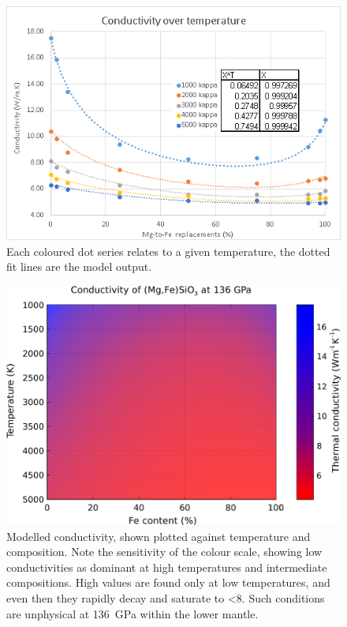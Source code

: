 \begin{figure}[h]
  \includegraphics[width=\linewidth]{Figures/draft_kC.png}
  \caption{Each coloured dot series relates to a given temperature, the dotted fit lines are the model output.}
  \label{fig:draft_kc}
\end{figure}

\begin{figure}[h]
  \includegraphics[width=\linewidth]{Figures/K_over_T_over_X.png}
  \caption{Modelled conductivity, shown plotted against temperature and composition. Note the sensitivity of the colour scale, showing low conductivities as dominant at high temperatures and intermediate compositions. High values are found only at low temperatures, and even then they rapidly decay and saturate to <8\wmk. Such conditions are unphysical at 136~GPa within the lower mantle.}
  \label{fig:draft_ktc}
\end{figure}



